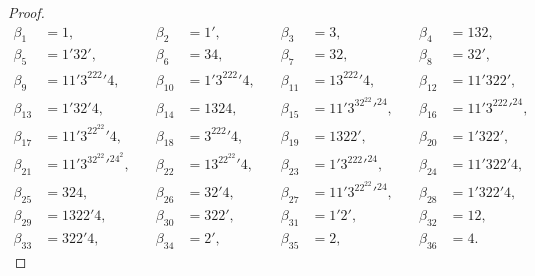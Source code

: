 \documentclass[12pt]{amsart}
\renewcommand\b{\beta}
\renewcommand{\1}{\mathbb 1}
\numberwithin{equation}{section}
\begin{document}
\begin{proof}
{\footnotesize
\begin{equation*}
\begin{aligned}
\b_1 &= 1, &\quad \b_2 &= 1', &\quad \b_3 &= 3, &\quad \b_4 &= 132, \\
\b_5 &= 1'32', &\quad \b_6 &= 34, &\quad \b_7 &= 32, &\quad \b_8 &= 32', \\
\b_9 &= 11'3^222'4, &\quad \b_{10} &= 1'3^222'4, &\quad  \b_{11} &= 13^222'4,
     &\quad \b_{12} &= 11'322', \\
\b_{13} &= 1'32'4, &\quad \b_{14} &= 1324, &\quad \b_{15} &= 11'3^32^22'^24,
      &\quad \b_{16} &= 11'3^222'^24, \\
\b_{17} &= 11'3^22^22'4, &\quad \b_{18} &= 3^222'4, &\quad \b_{19} &= 1322',
      &\quad \b_{20} &= 1'322', \\
\b_{21} &= 11'3^32^22'^24^2, &\quad \b_{22} &= 13^22^22'4, &\quad \b_{23} &= 1'3^222'^24, 
      &\quad \b_{24} &= 11'322'4, \\
\b_{25} &= 324, &\quad \b_{26} &= 32'4, &\quad \b_{27} &= 11'3^22^22'^24, 
       &\quad \b_{28} &= 1'322'4, \\
\b_{29} &= 1322'4, &\quad \b_{30} &= 322', &\quad \b_{31} &= 1'2',
       &\quad \b_{32} &= 12, \\
\b_{33} &= 322'4, &\quad \b_{34} &= 2', &\quad \b_{35} &= 2, &\quad \b_{36} &= 4.
\end{aligned}
\end{equation*}
}


\end{proof}
\end{document}
